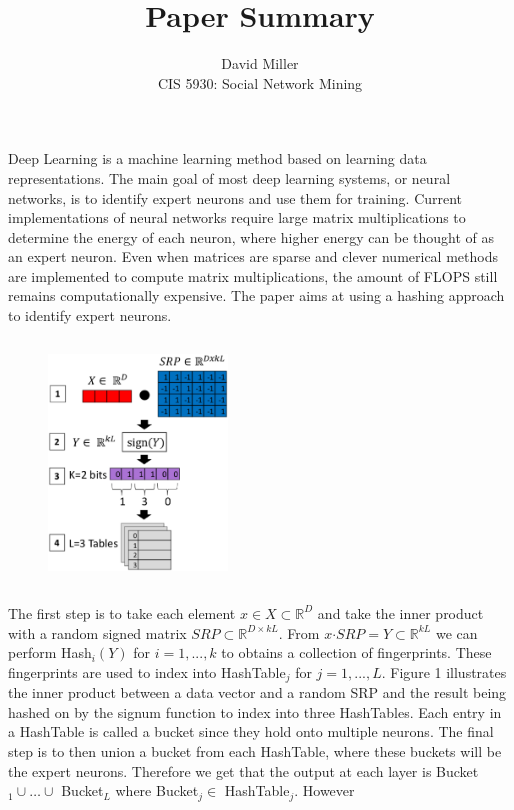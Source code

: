 \documentclass[12pt]{article}
\theoremstyle{remark}
\begin{document}
 
\title{Paper Summary}
\author{David Miller \\ 
CIS 5930: Social Network Mining} 

\maketitle

Deep Learning is a machine learning method based on learning data representations. The main goal of most deep learning systems, or neural networks, is to identify expert neurons and use them for training. Current implementations of neural networks require large matrix multiplications to determine the energy of each neuron, where higher energy can be thought of as an expert neuron. Even when matrices are sparse and clever numerical methods are implemented to compute matrix multiplications, the amount of FLOPS still remains computationally expensive. The paper aims at using a hashing approach to identify expert neurons. 
\begin{figure}
	\vspace{-15pt}
	\hspace{-20pt}
	\includegraphics[height=6.5cm,width=0.425\textwidth]{Figure1.eps}
	\caption{}
\end{figure}
\vspace{-13pt}
\begin{addmargin}[-40.3pt]{0pt}
The first step is to take each element $x \in X \subset \mathbb{R}^D$ and take the inner product with a random signed matrix $SRP \subset \mathbb{R}^{D \times kL}$. From $x \boldsymbol{\cdot} SRP = Y \subset \mathbb{R}^{kL}$ we can perform Hash$_i(Y)$ for $i = 1, ..., k$ to obtains a collection of fingerprints. These fingerprints are used to index into HashTable$_j$ for $j = 1, ..., L$. Figure 1 illustrates the inner product between a data vector and a random SRP and the result being hashed on by the signum function to index into three HashTables. Each entry in a HashTable is called a bucket since they hold onto multiple neurons. The final step is to then union a bucket from each HashTable, where these buckets will be the expert neurons. Therefore we get that the output at each layer is Bucket$_1 \cup \dots \cup$ Bucket$_L$ where Bucket$_j \in $ HashTable$_j$. However
\end{addmargin}
\end{document}
